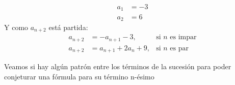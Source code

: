 \begin{enumerate}[label=\roman*)]

        \begin{align}
          a_1 & = -3 \\
          a_2 & = 6
        \end{align}
        Y como $a_{n+2}$ está partida:
        \begin{align}
          a_{n+2} & = -a_{n+1} - 3,       & \text{si $n$ es impar} \\
          a_{n+2} & = a_{n+1} + 2a_n + 9, & \text{si $n$ es par}
        \end{align}

        Veamos si hay algún patrón entre los términos de la sucesión para poder conjeturar una fórmula para su término
        n-ésimo


\end{enumerate}
